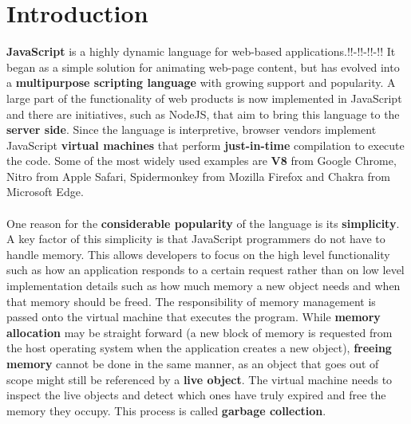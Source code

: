 \documentclass{l4proj}
\begin{document}
\chapter{Introduction}
\hspace*{3em} \textbf{JavaScript} is a highly dynamic language for web-based applications.\cite{intro}!!-!!-!!-!!%
 It began as a simple solution for animating web-page content, but has evolved into a \textbf{multipurpose scripting language} with growing support and popularity. A large part of the functionality of web products is now implemented in JavaScript and there are initiatives, such as NodeJS\cite{nodejs}, that aim to bring this language to the \textbf{server side}. Since the language is interpretive, browser vendors implement JavaScript \textbf{virtual machines} that perform \textbf{just-in-time} compilation to execute the code. Some of the most widely used examples are \textbf{V8} from Google Chrome\cite{v8}, Nitro from Apple Safari, Spidermonkey\cite{spidermk} from Mozilla Firefox and Chakra\cite{chakra} from Microsoft Edge.
\\\\%
\hspace*{3em} One reason for the \textbf{considerable popularity} of the language is its \textbf{simplicity}. A key factor of this simplicity is that JavaScript programmers do not have to handle memory. This allows developers to focus on the high level functionality such as how an application responds to a certain request rather than on low level implementation details such as how much memory a new object needs and when that memory should be freed. The responsibility of memory management is passed onto the virtual machine that executes the program. While \textbf{memory allocation} may be straight forward (a new block of memory is requested from the host operating system when the application creates a new object), \textbf{freeing memory} cannot be done in the same manner, as an object that goes out of scope might still be referenced by a \textbf{live object}. The virtual machine needs to inspect the live objects and detect which ones have truly expired and free the memory they occupy. This process is called \textbf{garbage collection}.
\\\\%
\end{document}
